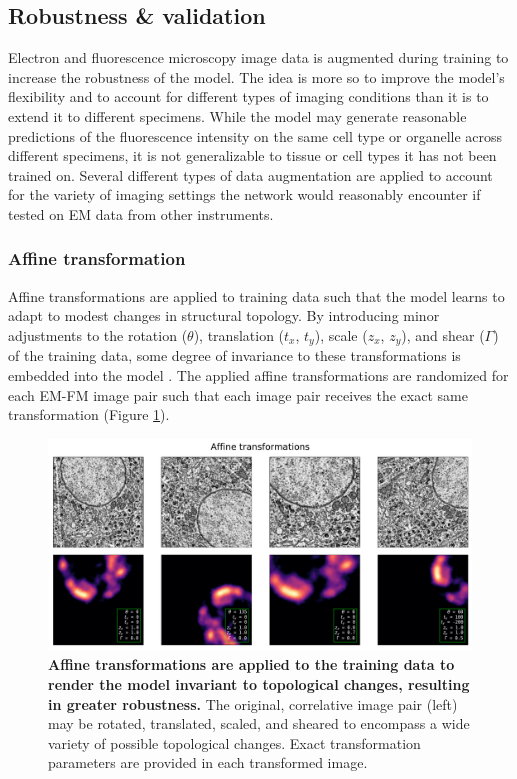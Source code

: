 \subsection{Robustness \& validation}
\label{sec:4methods_augment}
Electron and fluorescence microscopy image data is augmented during training to increase the robustness of the model. The idea is more so to improve the model's flexibility and to account for different types of imaging conditions than it is to extend it to different specimens. While the model may generate reasonable predictions of the fluorescence intensity on the same cell type or organelle across different specimens, it is not generalizable to tissue or cell types it has not been trained on. Several different types of data augmentation are applied to account for the variety of imaging settings the network would reasonably encounter if tested on EM data from other instruments.

\subsubsection{Affine transformation}
Affine transformations are applied to training data such that the model learns to adapt to modest changes in structural topology. By introducing minor adjustments to the rotation ($\theta$), translation ($t_x$, $t_y$), scale ($z_x$, $z_y$), and shear ($\Gamma$) of the training data, some degree of invariance to these transformations is embedded into the model \cite{simard2003best}. The applied affine transformations are randomized for each EM-FM image pair such that each image pair receives the exact same transformation (Figure \ref{fig:4m_affine}).

\begin{figure}[!tbh]
    \centering
    \includegraphics[width=\linewidth]{chapter-4/mfigs/mfig_affine.pdf}
    \caption{\textbf{Affine transformations are applied to the training data to render the model invariant to topological changes, resulting in greater robustness.}
    The original, correlative image pair (left) may be rotated, translated, scaled, and sheared to encompass a wide variety of possible topological changes. Exact transformation parameters are provided in each transformed image.}
    \label{fig:4m_affine}
\end{figure}

